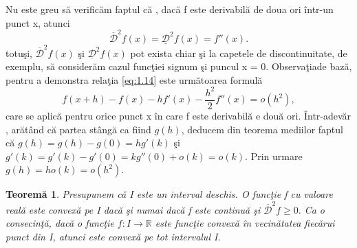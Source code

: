 \documentclass[a4paper,12pt,oneside]{report}
\newtheorem{theorem}{Teorem\u a}
\begin{document}
Nu este greu s\u{a} verific\u{a}m faptul c\u{a} , dac\u{a} f este derivabil\u{a} de doua ori \^{i}ntr-un punct x, atunci 
\begin{displaymath}
   \overline{ \mathcal{D}}^{2}f\left ( x \right ) = \underline{\mathcal{D}}^{2}f\left ( x \right ) = {f}''\left ( x \right ). \label{eq:1.14} \tag{eq1.14}
\end{displaymath}
totu\c{s}i, \(\overline{ \mathcal{D}}^{2}f\left ( x \right )\) \c{s}i \(\underline{\mathcal{D}}^{2}f\left ( x \right )\) pot exista chiar \c{s}i la capetele de discontinuitate, de exemplu, s\u{a} consider\u{a}m cazul func\c{t}iei signum \c{s}i puncul x = 0. Observa\c{t}iade baz\u{a}, pentru a demonstra rela\c{t}ia \ref{eq:1.14}  este urm\u{a}toarea formul\u{a}
\begin{displaymath}
   f\left ( x + h \right ) - f\left ( x \right ) - h{f}'\left ( x \right ) - \frac{h^{2}}{2}{f}''\left ( x \right ) = o\left ( h^{2} \right ), 
\end{displaymath}
care se aplic\u{a} pentru orice punct x \^{i}n care f este derivabil\u{a} e dou\u{a} ori. \^{I}ntr-adev\u{a}r , ar\u{a}t\^{a}nd c\u{a} partea st\^{a}ng\u{a} ca fiind \(g\left ( h \right )\), deducem din teorema mediilor faptul c\u{a} \(g\left ( h \right ) = g \left ( h \right ) - g\left ( 0 \right ) = h{g}'\left ( k \right )\) \c{s}i  \({g}'\left ( k \right ) = {g}'\left ( k \right ) - {g}'\left ( 0 \right ) = k{g}''\left ( 0 \right ) +o\left ( k \right ) = o\left ( k \right ). \)
	Prin urmare \(g\left ( h \right ) = ho\left ( k \right ) = o\left ( h^{2} \right ). \)
\begin{theorem}
Presupunem c\u{a} I este un interval deschis. O func\c{t}ie f cu valoare real\u{a} este convex\u{a} pe I dac\u{a} \c{s}i numai dac\u{a} f este continu\u{a} \c{s}i  \(\overline{ \mathcal{D}}^{2}f\geq 0.\) 
	Ca o consecin\c{t}\u{a}, dac\u{a} o func\c{t}ie \(f : I \rightarrow \mathbb{R}\) este  func\c{t}ie convex\u{a}  \^{i}n vecin\u{a}tatea fiec\u{a}rui punct din I, atunci este convex\u{a} pe tot intervalul I. 
\end{theorem}
\end{document}
